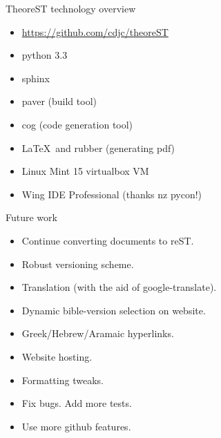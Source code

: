 \documentclass{beamer}
\begin{document}
\begin{frame}[fragile]{TheoreST technology overview}
\begin{itemize}
\item \url{https://github.com/cdjc/theoreST}
\item python 3.3
\item sphinx
\item paver (build tool)
\item cog (code generation tool)
\item \LaTeX\  and rubber (generating pdf)
\item Linux Mint 15 virtualbox VM
\item Wing IDE Professional (thanks nz pycon!)
\end{itemize}
\end{frame}

\begin{frame}{Future work}
\begin{itemize}
\item Continue converting documents to reST.
\item Robust versioning scheme.
\item Translation (with the aid of google-translate).
\item Dynamic bible-version selection on website.
\item Greek/Hebrew/Aramaic hyperlinks.
\item Website hosting.
\item Formatting tweaks.
\item Fix bugs. Add more tests.
\item Use more github features.
\end{itemize}

\end{frame}
\end{document}
